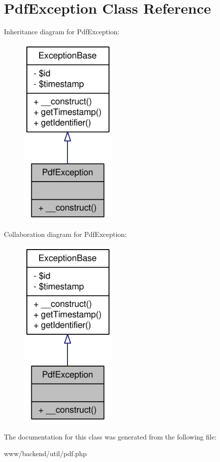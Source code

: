 \hypertarget{classPdfException}{
\section{PdfException Class Reference}
\label{classPdfException}
}


Inheritance diagram for PdfException:\nopagebreak
\begin{figure}[H]
\begin{center}
\leavevmode
\includegraphics[width=136pt]{classPdfException__inherit__graph}
\end{center}
\end{figure}


Collaboration diagram for PdfException:\nopagebreak
\begin{figure}[H]
\begin{center}
\leavevmode
\includegraphics[width=136pt]{classPdfException__coll__graph}
\end{center}
\end{figure}


The documentation for this class was generated from the following file:\begin{DoxyCompactItemize}
\item 
www/backend/util/pdf.php\end{DoxyCompactItemize}
